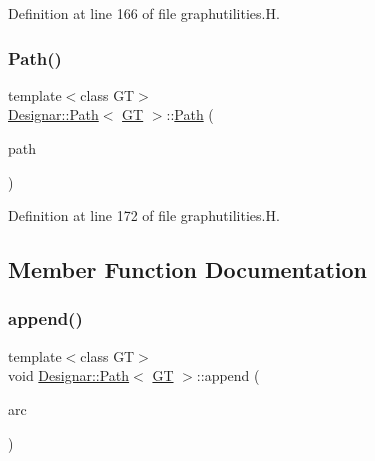 Definition at line 166 of file graphutilities.\+H.

\mbox{\label{class_designar_1_1_path_a873d668006017c410e6808ffb162ceb8}} 
\subsubsection{\texorpdfstring{Path()}{Path()}\hspace{0.1cm}{\footnotesize\ttfamily [4/4]}}
{\footnotesize\ttfamily template$<$class GT$>$ \\
\hyperlink{class_designar_1_1_path}{Designar\+::\+Path}$<$ \hyperlink{demo-buildgraph_8_c_a3001c40d2c31ca87ed96cd7d1334a55e}{GT} $>$\+::\hyperlink{class_designar_1_1_path}{Path} (\begin{DoxyParamCaption}\item[{\hyperlink{class_designar_1_1_path}{Path}$<$ \hyperlink{demo-buildgraph_8_c_a3001c40d2c31ca87ed96cd7d1334a55e}{GT} $>$ \&\&}]{path }\end{DoxyParamCaption})\hspace{0.3cm}{\ttfamily [inline]}}



Definition at line 172 of file graphutilities.\+H.



\subsection{Member Function Documentation}
\mbox{\label{class_designar_1_1_path_a985717f0848469b05dfc8172eb483ad4}} 
\subsubsection{\texorpdfstring{append()}{append()}\hspace{0.1cm}{\footnotesize\ttfamily [1/2]}}
{\footnotesize\ttfamily template$<$class GT$>$ \\
void \hyperlink{class_designar_1_1_path}{Designar\+::\+Path}$<$ \hyperlink{demo-buildgraph_8_c_a3001c40d2c31ca87ed96cd7d1334a55e}{GT} $>$\+::append (\begin{DoxyParamCaption}\item[{\hyperlink{class_designar_1_1_path_a6e13966351659cedcf3233098b2b7384}{Arc\+Type} \&}]{arc }\end{DoxyParamCaption})\hspace{0.3cm}{\ttfamily [inline]}}



